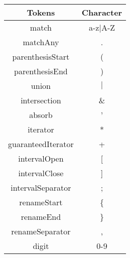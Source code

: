 \begin{tabular}{|c|c|}
    \hline
    \textbf{Tokens} & \textbf{Character}\\
    \hline
    match & a-z$\mid$A-Z\\
    \hline
    matchAny & .\\
    \hline
    parenthesisStart & (\\
    \hline
    parenthesisEnd & )\\
    \hline
    union & $\mid$\\
    \hline
    intersection & \&\\
    \hline
    absorb & '\\
    \hline
    iterator & *\\
    \hline
    guaranteedIterator & +\\
    \hline
    intervalOpen & [\\
    \hline
    intervalClose & ]\\
    \hline
    intervalSeparator & ;\\
    \hline
    renameStart & \{\\
    \hline
    renameEnd & \}\\
    \hline
    renameSeparator & ,\\
    \hline
    digit & 0-9\\
    \hline
\end{tabular}